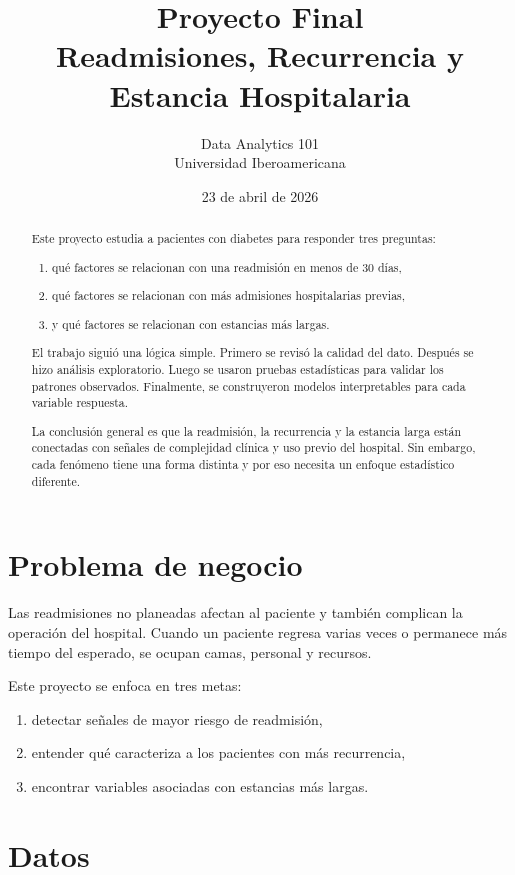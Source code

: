 \documentclass[12pt]{article}
\title{\textbf{Proyecto Final\\Readmisiones, Recurrencia y Estancia Hospitalaria}}
\author{Data Analytics 101 \\ Universidad Iberoamericana}
\date{23 de abril de 2026}
\begin{document}
\maketitle

\begin{abstract}
Este proyecto estudia a pacientes con diabetes para responder tres preguntas:
\begin{enumerate}[leftmargin=1.6em]
    \item qué factores se relacionan con una readmisión en menos de 30 días,
    \item qué factores se relacionan con más admisiones hospitalarias previas,
    \item y qué factores se relacionan con estancias más largas.
\end{enumerate}

El trabajo siguió una lógica simple. Primero se revisó la calidad del dato. Después se hizo análisis exploratorio. Luego se usaron pruebas estadísticas para validar los patrones observados. Finalmente, se construyeron modelos interpretables para cada variable respuesta.

La conclusión general es que la readmisión, la recurrencia y la estancia larga están conectadas con señales de complejidad clínica y uso previo del hospital. Sin embargo, cada fenómeno tiene una forma distinta y por eso necesita un enfoque estadístico diferente.
\end{abstract}

\section{Problema de negocio}

Las readmisiones no planeadas afectan al paciente y también complican la operación del hospital. Cuando un paciente regresa varias veces o permanece más tiempo del esperado, se ocupan camas, personal y recursos.

Este proyecto se enfoca en tres metas:
\begin{enumerate}[leftmargin=1.6em]
    \item detectar señales de mayor riesgo de readmisión,
    \item entender qué caracteriza a los pacientes con más recurrencia,
    \item encontrar variables asociadas con estancias más largas.
\end{enumerate}

\section{Datos}
\end{document}
